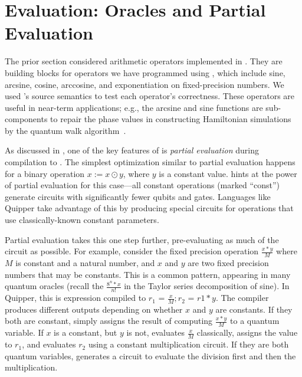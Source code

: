 \section{Evaluation: \vqimp Oracles and Partial Evaluation}
\label{sec:partial-eval}

The prior section considered arithmetic operators implemented in
\oqasm. They are building blocks for operators we have programmed using
\vqimp, which include sine, 
arcsine, cosine, arccosine, and exponentiation on fixed-precision
numbers. We used \vqimp's source semantics to test each operator's
correctness.
These operators are useful in near-term applications; e.g., the
arcsine and sine functions are sub-components to repair the phase
values in constructing Hamiltonian simulations~\cite{feynman1982simulating} by the quantum walk
algorithm~\cite{Childs_2009}. 

As discussed in , one of the key features of \vqimp is \emph{partial evaluation} during compilation to \vqir.
The simplest optimization similar to partial evaluation happens for a
binary operation $x := x\odot y$, where $y$ is a constant value. 
 hints at the power of partial evaluation for this case---all constant operations (marked ``const'') generate circuits with significantly fewer qubits and gates.
Languages like Quipper take advantage of this by producing special circuits for operations that use classically-known constant parameters.

Partial evaluation takes this one step further, pre-evaluating as much of the circuit as possible.
For example, consider the fixed precision operation $\frac{x*y}{M}$ where
$M$ is constant and a natural number, and $x$ and $y$ are two fixed precision numbers that may be constants.
This is a common pattern, appearing in many quantum oracles (recall the $\frac{8^n*x}{n!}$ in the Taylor series decomposition of sine). 
In Quipper, this is expression compiled to ${r_1}\texttt{ = }{\frac{x}{M}}; {r_2}\texttt{ = }{r1*y}$.
%
The \vqimp compiler produces different outputs depending on whether $x$ and $y$ are constants. If they both are constant, \vqimp simply assigns the result of computing $\frac{x*y}{M}$ to a quantum variable. If $x$ is a constant, but $y$ is not, \vqimp evaluates $\frac{x}{M}$ classically, assigns the value to $r_1$, and evaluates $r_2$ using a constant multiplication circuit. If they are both quantum variables, \vqimp generates a circuit to evaluate the division first and then the multiplication.

